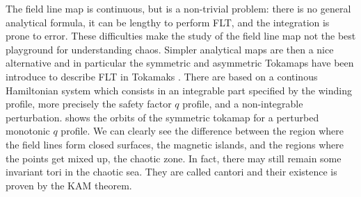 The field line map is continuous, but is a non-trivial problem: there is no general analytical formula, it can be lengthy to perform FLT, and the integration is prone to error. These difficulties make the study of the field line map not the best playground for understanding chaos.  Simpler analytical maps are then a nice alternative and in particular the symmetric and asymmetric Tokamaps have been introduce to describe FLT in Tokamaks \cite{abdullaev_mappings_2006}. There are based on a continous Hamiltonian system which consists in an integrable part specified by the winding profile, more precisely the safety factor $q$ profile, and a non-integrable perturbation.  shows the orbits of the symmetric tokamap for a perturbed monotonic $q$ profile. We can clearly see the difference between the region where the field lines form closed surfaces, the magnetic islands, and the regions where the points get mixed up, the chaotic zone. In fact, there may still remain some invariant tori in the chaotic sea. They are called cantori and their existence is proven by the KAM theorem.

